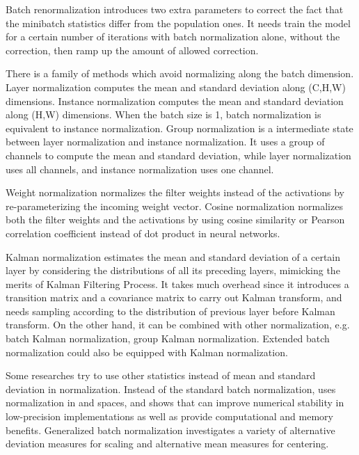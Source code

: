 \documentclass[runningheads]{llncs}
\begin{document}
Batch renormalization \cite{ioffe2017batch} introduces two extra parameters to correct the fact that the minibatch statistics differ from the population ones.
It needs train the model for a certain number of iterations with batch normalization alone, without the correction, then ramp up the amount of allowed correction.

There is a family of methods which avoid normalizing along the batch dimension. Layer normalization \cite{ba2016layer} computes the mean and standard deviation along (C,H,W) dimensions. Instance normalization \cite{ulyanov2016instance} computes the mean and standard deviation along (H,W) dimensions. When the batch size is 1, batch normalization is equivalent to instance normalization.
Group normalization \cite{wu2018group} is a intermediate state between layer normalization and instance normalization. It uses a group of channels to compute the mean and standard deviation,
while layer normalization uses all channels, and instance normalization uses one channel.

Weight normalization \cite{salimans2016weight} normalizes the filter weights instead of the activations by re-parameterizing the incoming weight vector.  
Cosine normalization \cite{luo2017cosine} normalizes both the filter weights and the activations by using cosine similarity or Pearson correlation coefficient instead of dot product in neural networks.

Kalman normalization \cite{wang2018kalman} estimates the mean and standard deviation of a certain layer by considering the distributions of all its preceding layers, mimicking the merits of Kalman Filtering Process. It takes much overhead since it introduces a transition matrix and a covariance matrix to carry out Kalman transform, and needs sampling according to the distribution of previous layer before Kalman transform. 
On the other hand, it can be combined with other normalization, e.g. batch Kalman normalization, group Kalman normalization. Extended batch normalization could also be equipped with Kalman normalization.

Some researches try to use other statistics instead of mean and standard deviation in normalization. Instead of the standard  batch normalization, \cite{hoffer2018norm} uses normalization in  and  spaces, and shows that can improve numerical stability in low-precision implementations as well as provide computational and memory benefits. Generalized batch normalization \cite{yuan2019generalized} investigates a variety of alternative deviation measures for scaling and alternative mean measures for centering.
\end{document}
